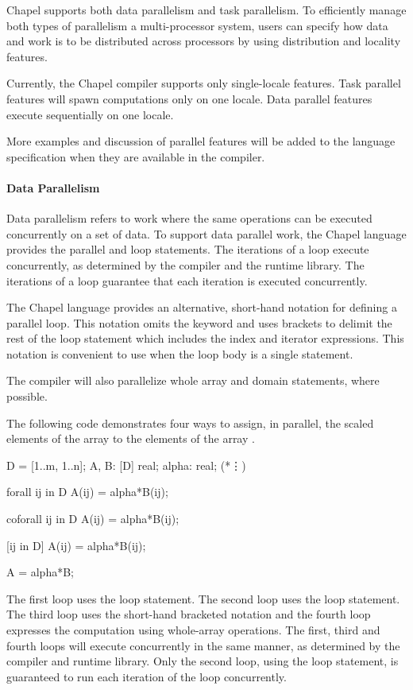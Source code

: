 Chapel supports both data parallelism and task
parallelism.  To efficiently manage both types of parallelism 
a multi-processor system, users can specify how data and
work is to be distributed across processors by using
distribution and locality features.

\begin{status}
Currently, the Chapel compiler supports only single-locale features.
Task parallel features will spawn computations only on one locale.
Data parallel features execute sequentially on one locale.  

More examples and discussion of parallel features will be added to
the language specification when they are available in the compiler.
\end{status}

\paragraph{Data Parallelism}
Data parallelism refers to work where the same operations can be executed 
concurrently on a set of data.  
To support data parallel work, the Chapel language provides the parallel 
 and  loop statements.  The iterations of 
a  loop execute concurrently, as determined by the compiler 
and the runtime library.  The iterations of a  loop
guarantee that each iteration is executed concurrently.

The Chapel language provides an alternative, short-hand notation for 
defining a parallel loop.  This notation omits the  keyword
and uses brackets to delimit the rest of the loop statement which includes
the index and iterator expressions.  This notation is convenient to use
when the loop body is a single statement.  

The compiler will also parallelize whole array and domain statements, 
where possible.

\begin{example}
The following code demonstrates four ways to assign, in parallel, 
the scaled elements of the array  to the elements of 
the array .  
\begin{chapel}  
D = [1..m, 1..n];
A, B: [D] real;
alpha: real;
(*\vdots*)

forall ij in D {
  A(ij) = alpha*B(ij);
} 

coforall ij in D {
  A(ij) = alpha*B(ij);
} 

[ij in D] A(ij) = alpha*B(ij);

A = alpha*B;
\end{chapel}
The first loop uses the  loop statement.  The second
loop uses the  loop statement.  The third 
loop uses the short-hand bracketed notation and the fourth loop expresses
the computation using whole-array operations.  The first, third and
fourth loops will execute concurrently in the same manner, as 
determined by the compiler and runtime library.  Only the second loop,
using the  loop statement, is guaranteed to run each 
iteration of the loop concurrently.
\end{example}

